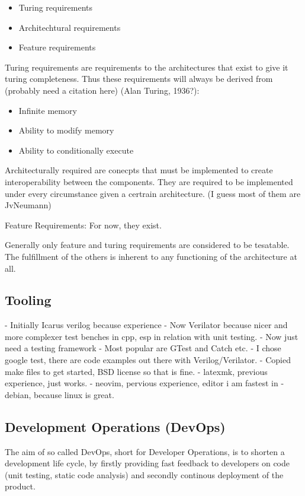 \begin{itemize}
  \item Turing requirements
  \item Architechtural requirements
  \item Feature requirements
\end{itemize}


\newtheorem{turing-requirement}{Turing Req.}[subsection]
Turing requirements are requirements to the architectures that exist to give it turing completeness. Thus these requirements will always be derived from (probably need a citation here) (Alan Turing, 1936?): 
\begin{itemize}
  \item Infinite memory
  \item Ability to modify memory
  \item Ability to conditionally execute
\end{itemize}

\newtheorem{arch-requirement}{Arch. Req.}[subsection]
Architecturally required are conecpts that must be implemented to create interoperability between the components. They are required to be implemented under every circumstance given a certrain architecture. (I guess most of them are JvNeumann)

\newtheorem{feat-requirement}{Feat. Req.}[subsection]
Feature Requirements: For now, they exist.


Generally only feature and turing requirements are considered to be tesatable. The fulfillment of the others is inherent to any functioning of the architecture at all. 

\subsection{Tooling}
- Initially Icarus verilog because experience
- Now Verilator because nicer and more complexer test benches in cpp, esp in relation with unit testing. 
- Now just need a testing framework
- Most popular are GTest and Catch etc. 
- I chose google test, there are code examples out there with Verilog/Verilator. 
- Copied make files to get started, BSD license so that is fine. 
- latexmk, previous experience, just works.
- neovim, pervious experience, editor i am fastest in
- debian, because linux is great. 


\subsection{Development Operations (DevOps)}
The aim of so called DevOps, short for Developer Operations, is to shorten a development life cycle, by firstly providing fast feedback to developers on code (unit testing, static code analysis) and secondly continous deployment of the product.  

